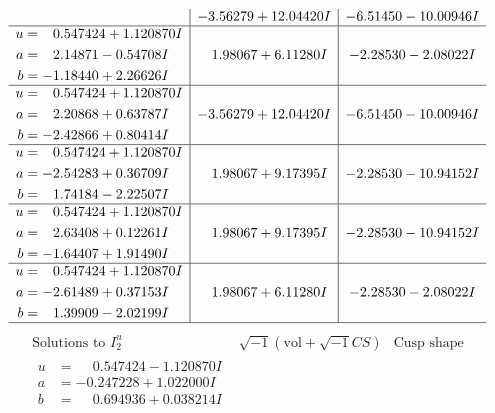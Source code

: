 \documentclass[1p]{elsarticle_modified}
\theoremstyle{definition}
\newcommand{\I}{\sqrt{-1}}
\begin{document}
$$\begin{array}{c|c|c}
 & -3.56279 + 12.04420 I & -6.51450 - 10.00946 I \\ \hline\begin{aligned}
u &= \phantom{-}0.547424 + 1.120870 I \\
a &= \phantom{-}2.14871 - 0.54708 I \\
b &= -1.18440 + 2.26626 I\end{aligned}
 & \phantom{-}1.98067 + 6.11280 I & -2.28530 - 2.08022 I \\ \hline\begin{aligned}
u &= \phantom{-}0.547424 + 1.120870 I \\
a &= \phantom{-}2.20868 + 0.63787 I \\
b &= -2.42866 + 0.80414 I\end{aligned}
 & -3.56279 + 12.04420 I & -6.51450 - 10.00946 I \\ \hline\begin{aligned}
u &= \phantom{-}0.547424 + 1.120870 I \\
a &= -2.54283 + 0.36709 I \\
b &= \phantom{-}1.74184 - 2.22507 I\end{aligned}
 & \phantom{-}1.98067 + 9.17395 I & -2.28530 - 10.94152 I \\ \hline\begin{aligned}
u &= \phantom{-}0.547424 + 1.120870 I \\
a &= \phantom{-}2.63408 + 0.12261 I \\
b &= -1.64407 + 1.91490 I\end{aligned}
 & \phantom{-}1.98067 + 9.17395 I & -2.28530 - 10.94152 I \\ \hline\begin{aligned}
u &= \phantom{-}0.547424 + 1.120870 I \\
a &= -2.61489 + 0.37153 I \\
b &= \phantom{-}1.39909 - 2.02199 I\end{aligned}
 & \phantom{-}1.98067 + 6.11280 I & -2.28530 - 2.08022 I\\
 \hline 
 \end{array}$$\newpage$$\begin{array}{c|c|c}  
\text{Solutions to }I^u_{2}& \I (\text{vol} + \sqrt{-1}CS) & \text{Cusp shape}\\
 \hline 
\begin{aligned}
u &= \phantom{-}0.547424 - 1.120870 I \\
a &= -0.247228 + 1.022000 I \\
b &= \phantom{-}0.694936 + 0.038214 I\end{aligned}

\end{array}$$
\end{document}
